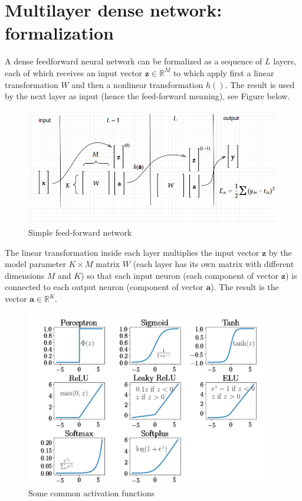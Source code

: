 \documentclass{article}
\begin{document}
\section{Multilayer dense network: formalization}
A dense feedforward neural network can be formalized as a sequence of $\displaystyle L$ layers, each of which receives an input vector $\displaystyle \mathbf{z} \in \mathbb{R}^{M}$ to which apply first a linear transformation $\displaystyle W$ and then a nonlinear transformation $\displaystyle h()$. The result is used by the next layer as input (hence the feed-forward meaning), see Figure below.

\begin{figure}[H]
    \centering
    \includegraphics[width=0.8\linewidth]{images/multi layers network.png}
    \caption{Simple feed-forward network}
    \label{fig:multi-layer-network}
\end{figure}

The linear transformation inside each layer multiplies the input vector $\displaystyle \mathbf{z}$ by the model parameter $\displaystyle K\times M$ matrix $\displaystyle W$ (each layer has its own matrix with different dimensions $M$ and $K$) so that each input neuron (each component of vector $\displaystyle \mathbf{z}$) is connected to each output neuron (component of vector $\displaystyle \mathbf{a}$). The result is the vector $\displaystyle \mathbf{a} \in \mathbb{R}^{K}$.

\begin{figure}[H]
    \centering
    \includegraphics[width=0.6\linewidth]{images/activation functions.png}
    \caption{Some common activation functions}    
    
\end{figure}
\end{document}
